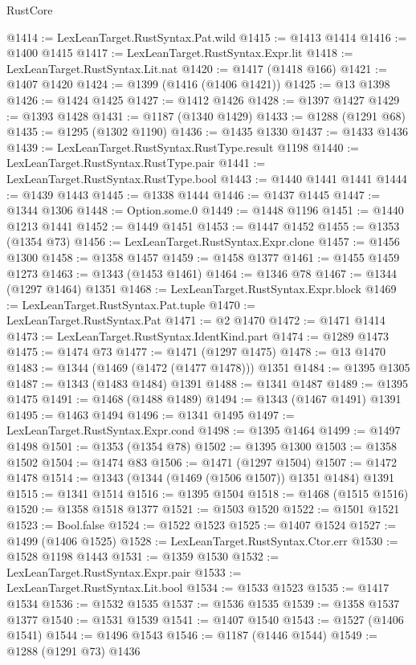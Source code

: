 \begin{lexlean}{RustCore}
\begin{coremodule}
@1414 := LexLeanTarget.RustSyntax.Pat.wild
@1415 := @1413 @1414
@1416 := @1400 @1415
@1417 := LexLeanTarget.RustSyntax.Expr.lit
@1418 := LexLeanTarget.RustSyntax.Lit.nat
@1420 := @1417 (@1418 @166)
@1421 := @1407 @1420
@1424 := @1399 (@1416 (@1406 @1421))
@1425 := @13 @1398
@1426 := @1424 @1425
@1427 := @1412 @1426
@1428 := @1397 @1427
@1429 := @1393 @1428
@1431 := @1187 (@1340 @1429)
@1433 := @1288 (@1291 @68)
@1435 := @1295 (@1302 @1190)
@1436 := @1435 @1330
@1437 := @1433 @1436
@1439 := LexLeanTarget.RustSyntax.RustType.result @1198
@1440 := LexLeanTarget.RustSyntax.RustType.pair
@1441 := LexLeanTarget.RustSyntax.RustType.bool
@1443 := @1440 @1441 @1441
@1444 := @1439 @1443
@1445 := @1338 @1444
@1446 := @1437 @1445
@1447 := @1344 @1306
@1448 := Option.some.{0}
@1449 := @1448 @1196
@1451 := @1440 @1213 @1441
@1452 := @1449 @1451
@1453 := @1447 @1452
@1455 := @1353 (@1354 @73)
@1456 := LexLeanTarget.RustSyntax.Expr.clone
@1457 := @1456 @1300
@1458 := @1358 @1457
@1459 := @1458 @1377
@1461 := @1455 @1459 @1273
@1463 := @1343 (@1453 @1461)
@1464 := @1346 @78
@1467 := @1344 (@1297 @1464) @1351
@1468 := LexLeanTarget.RustSyntax.Expr.block
@1469 := LexLeanTarget.RustSyntax.Pat.tuple
@1470 := LexLeanTarget.RustSyntax.Pat
@1471 := @2 @1470
@1472 := @1471 @1414
@1473 := LexLeanTarget.RustSyntax.IdentKind.part
@1474 := @1289 @1473
@1475 := @1474 @73
@1477 := @1471 (@1297 @1475)
@1478 := @13 @1470
@1483 := @1344 (@1469 (@1472 (@1477 @1478))) @1351
@1484 := @1395 @1305
@1487 := @1343 (@1483 @1484) @1391
@1488 := @1341 @1487
@1489 := @1395 @1475
@1491 := @1468 (@1488 @1489)
@1494 := @1343 (@1467 @1491) @1391
@1495 := @1463 @1494
@1496 := @1341 @1495
@1497 := LexLeanTarget.RustSyntax.Expr.cond
@1498 := @1395 @1464
@1499 := @1497 @1498
@1501 := @1353 (@1354 @78)
@1502 := @1395 @1300
@1503 := @1358 @1502
@1504 := @1474 @83
@1506 := @1471 (@1297 @1504)
@1507 := @1472 @1478
@1514 := @1343 (@1344 (@1469 (@1506 @1507)) @1351 @1484) @1391
@1515 := @1341 @1514
@1516 := @1395 @1504
@1518 := @1468 (@1515 @1516)
@1520 := @1358 @1518 @1377
@1521 := @1503 @1520
@1522 := @1501 @1521
@1523 := Bool.false
@1524 := @1522 @1523
@1525 := @1407 @1524
@1527 := @1499 (@1406 @1525)
@1528 := LexLeanTarget.RustSyntax.Ctor.err
@1530 := @1528 @1198 @1443
@1531 := @1359 @1530
@1532 := LexLeanTarget.RustSyntax.Expr.pair
@1533 := LexLeanTarget.RustSyntax.Lit.bool
@1534 := @1533 @1523
@1535 := @1417 @1534
@1536 := @1532 @1535
@1537 := @1536 @1535
@1539 := @1358 @1537 @1377
@1540 := @1531 @1539
@1541 := @1407 @1540
@1543 := @1527 (@1406 @1541)
@1544 := @1496 @1543
@1546 := @1187 (@1446 @1544)
@1549 := @1288 (@1291 @73) @1436

\end{coremodule}
\end{lexlean}
